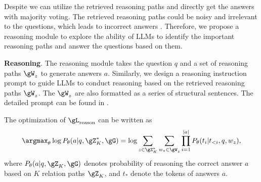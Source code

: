 Despite we can utilize the retrieved reasoning paths and directly get the answers with majority voting. The retrieved reasoning paths could be noisy and irrelevant to the questions, which leads to incorrect answers \citep{he2021improving,zhang2022subgraph}. Therefore, we propose a reasoning module to explore the ability of LLMs to identify the important reasoning paths and answer the questions based on them.

\noindent\textbf{Reasoning}. The reasoning module takes the question $q$ and a set of reasoning paths $\gW_z$ to generate answers $a$. 
Similarly, we design a reasoning instruction prompt to guide LLMs to conduct reasoning based on the retrieved reasoning paths $\gW_z$. The $\gW_z$ are also formatted as a series of structural sentences.
%
%
The detailed prompt can be found in . 

The optimization of $\gL_{\text{reason}}$ can be written as
\begin{equation}
    \setlength\abovedisplayskip{1pt}%
    \setlength\belowdisplayskip{1pt}
    \argmax_\theta \log P_\theta(a|q,\RE{\gZ^*_K},\gG) =  \log \sum_{z\in\RE{\gZ^*_K}}\sum_{w_z\in\gW_z}\prod_{i=1}^{|a|}P_\theta(t_i|t_{<i},q,w_z),
\end{equation}
where $P_\theta(a|q,\gZ_K,\gG)$ denotes probability of reasoning the correct answer $a$ based on $K$ relation paths $\gZ_K$, and $t_*$ denote the tokens of answers $a$.


